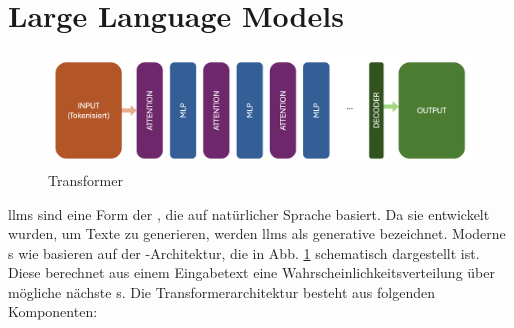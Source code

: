 \documentclass[../main.tex]{subfiles}
\begin{document}
\section{Large Language Models}
\label{sec:llm}

\begin{figure}[h!]
  \includegraphics[scale=0.37]{bilder/Transformer.png}
  \caption{Transformer}
  \label{fig:trans}
\end{figure}

\glspl{llm} sind eine Form der , die auf natürlicher Sprache basiert. Da sie entwickelt wurden, um Texte zu generieren, werden \glspl{llm} als generative %
 bezeichnet. Moderne s wie  basieren auf der -Architektur, die in Abb. \ref{fig:trans} schematisch dargestellt ist. Diese 
berechnet aus einem Eingabetext eine Wahrscheinlichkeitsverteilung über mögliche nächste s. Die Transformerarchitektur besteht aus folgenden Komponenten: \cite{architecture}\\
\end{document}
